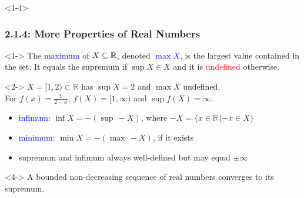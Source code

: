 \documentclass[10pt,english,aspectratio=169]{beamer}
\begin{document}
\begin{frame}<1-4>
\frametitle{2.1.4: More Properties of Real Numbers}

\begin{definition}<1->
The \textcolor{blue}{maximum} of $X\subseteq \mathbb{R}$, denoted \textcolor{blue}{$\max X$}, is the largest value contained in the set.
It equals the supremum if $\sup X \in X$ and it is \textcolor{red}{undefined} otherwise.
\end{definition}

\begin{example}<2->
$X = [1,2) \subset \mathbb{R}$ has $\sup X = 2$ and $\max X$ undefined. \\[1mm]
For $f(x)=\frac{1}{2-x}$, $f(X) = [1,\infty)$ and $\sup f(X) = \infty$.
\end{example}

\begin{itemize}
\item<3-> \textcolor{blue}{infimum}: $\inf X = - \left(\sup \, -\!X\right)$, where $-\!X = \{x\in \mathbb{R}\,|-\!x\in X\}$
\item<3-> \textcolor{blue}{minimum}: $\min X = - \left(\max \, -\!X \right)$, if it exists
\item<3-> supremum and infimum always well-defined but may equal $\pm \infty$
\end{itemize}

\begin{theorem}<4->
A bounded non-decreasing sequence of real numbers converges to its supremum.
\end{theorem}


\end{frame}  
\end{document}
